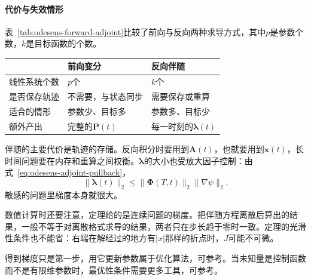 \paragraph{代价与失效情形}
表~\ref{tab:odesens-forward-adjoint}比较了前向与反向两种求导方式，其中$p$是参数个数，$k$是目标函数的个数。

\begin{BookInlineTable}
  \centering
  \caption{前向变分与反向伴随的代价对比。线性系统指沿同一条轨迹的$n$维线性初值问题。}
  \label{tab:odesens-forward-adjoint}
  \begin{tabular}{p{22mm}p{38mm}p{38mm}}
    \toprule
    & 前向变分 & 反向伴随 \\
    \midrule
    线性系统个数 & $p$个 & $k$个 \\
    是否保存轨迹 & 不需要，与状态同步 & 需要保存或重算 \\
    适合的情形 & 参数少、目标多 & 参数多、目标少 \\
    额外产出 & 完整的$\bm{P}(t)$ & 每一时刻的$\bm{\lambda}(t)$ \\
    \bottomrule
  \end{tabular}
\end{BookInlineTable}

伴随的主要代价是轨迹的存储。反向积分时要用到$\bm{A}(t)$，也就要用到$\bm{x}(t)$，长时间问题要在内存和重算之间权衡。$\bm{\lambda}$的大小也受放大因子控制：由式~\eqref{eq:odesens-adjoint-pullback}，
\[
 \lVert\bm{\lambda}(t)\rVert_2\leq\lVert\bm{\Phi}(T,t)\rVert_2\lVert\nabla\psi\rVert_2.
\]
敏感的问题里梯度本身就很大。

数值计算时还要注意，定理给的是连续问题的梯度。把伴随方程离散后算出的结果，一般不等于对离散格式求导的结果，两者只在步长趋于零时一致。定理的光滑性条件也不能省：右端在解经过的地方有$\lvert x\rvert$那样的折点时，$J$可能不可微。

得到梯度只是第一步，用它更新参数属于优化算法，可参考。当未知量是控制函数而不是有限维参数时，最优性条件需要更多工具，可参考。
